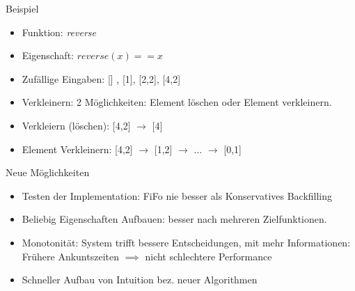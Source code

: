 \documentclass[aspectratio=169,10pt]{beamer}
\begin{document}
\begin{frame}[t, fragile]{Beispiel}
\begin{itemize}

	\item Funktion: \emph{reverse}
	\item Eigenschaft: $reverse(x) == x$
	\item Zuf\"allige Eingaben: [] , [1], [2,2], [4,2]\lightning
	\item Verkleinern: 2 M\"oglichkeiten: Element l\"oschen oder Element verkleinern. 
	\item Verkleiern (l\"oschen): [4,2] $\rightarrow$ [4] \lightning
	\item Element Verkleinern: [4,2] $\rightarrow$ [1,2] $\rightarrow$ ... $\rightarrow$ [0,1]
\end{itemize}
\end{frame}

\begin{frame}[t, fragile]{Neue M\"oglichkeiten}
\begin{itemize}
	\item Testen der Implementation: FiFo nie besser als Konservatives Backfilling
	\item Beliebig Eigenschaften Aufbauen: besser nach mehreren Zielfunktionen.
	\item Monotonit\"at: System trifft bessere Entscheidungen, mit mehr Informationen: Fr\"uhere Ankuntszeiten $\implies$ nicht schlechtere Performance
	\item Schneller Aufbau von Intuition bez. neuer Algorithmen
\end{itemize}
\end{frame}
\end{document}
